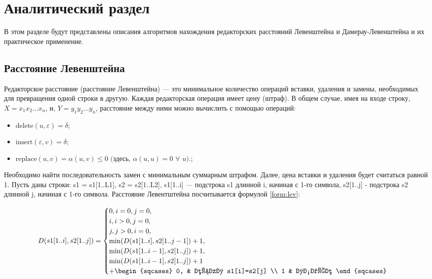 \chapter{Аналитический раздел}\label{analyth}

В этом разделе будут представлены описания алгоритмов нахождения редакторских расстояний Левенштейна и Дамерау-Левенштейна и их практическое применение.



\section{Расстояние Левенштейна}\label{defs}

Редакторское расстояние (расстояние Левенштейна) --- это минимальное количество операций вставки, удаления и замены, необходимых для превращения одной строки в другую. Каждая редакторская операция имеет цену (штраф). 
В общем случае, имея на входе строку, $X = x_1x_2 \dots x_n$, и, $Y = y_1y_2 \dots y_n$, расстояние между ними можно вычислить с помощью операций:
\begin{itemize}
	\item ${\text{delete}(u, \varepsilon) = \delta}$;
	\item $\text{insert}(\varepsilon, v) = \delta$;
	\item $\text{replace}(u, v) = \alpha(u, v) \leq 0$  $($здесь, $\alpha(u, u) = 0$ $\forall$ $u).$;
\end{itemize}

Необходимо найти последовательность замен с минимальным суммарным штрафом. Далее, цена вставки и удаления будет считаться равной 1.
 Пусть даны строки: s1 = s1[1..L1], s2 = s2[1..L2], s1[1..i] --- подстрока s1 длинной i, начиная с 1-го символа, s2[1..j] - подстрока s2 длинной j, начиная с 1-го символа. Расстояние Левентштейна посчитывается формулой \ref{form:lev}:
 
\begin{equation}\label{form:lev}
	D(s1[1..i], s2[1..j]) =
	\begin{cases}
		0,        i = 0, j =0,\\
		i,   i > 0, j =0, \\
		j,  j > 0, i = 0, \\
		\min(D(s1[1..i], s2[1..j-1]) + 1,\\ 
		\min(D(s1[1..i-1], s2[1..j]) + 1, \\
		\min(D(s1[1..i-1], s2[1..j]) + 1 \\ + 
		\begin{sqcases}
			0, & если s1[i]=s2[j] \\
			1 & иначе
		\end{sqcases}
	\end{cases}
\end{equation}


